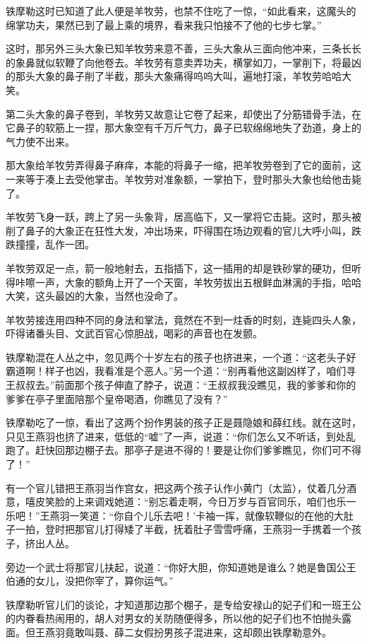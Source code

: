 \documentclass[12pt,oneside]{book}
\begin{document}
铁摩勒这时已知道了此人便是羊牧劳，也禁不住吃了一惊，``如此看来，这魔头的绵掌功夫，果然已到了最上乘的境界，看来我只怕接不了他的七步七掌。''

这时，那另外三头大象已知羊牧劳来意不善，三头大象从三面向他冲来，三条长长的象鼻就似软鞭了向他卷去。羊牧劳有意卖弄功夫，横掌如刀，一掌削下，将最凶的那头大象的鼻子削了半截，那头大象痛得呜呜大叫，遍地打滚，羊牧劳哈哈大笑。

第二头大象的鼻子卷到，羊牧劳又故意让它卷了起来，却使出了分筋错骨手法，在它鼻子的软筋上一捏，那大象空有千万斤气力，鼻子已软绵绵地失了劲道，身上的气力使不出来。

那大象给羊牧劳弄得鼻子麻痒，本能的将鼻子一缩，把羊牧劳卷到了它的面前，这一来等于凑上去受他掌击。羊牧劳对准象额，一掌拍下，登时那头大象也给他击毙了。

羊牧劳飞身一跃，跨上了另一头象背，居高临下，又一掌将它击毙。这时，那头被削了鼻子的大象正在狂性大发，冲出场来，吓得围在场边观看的官儿大呼小叫，跌跌撞撞，乱作一团。

羊牧劳双足一点，箭一般地射去，五指插下，这一插用的却是铁砂掌的硬功，但听得咔嚓一声，大象的额角上开了一个天窗，羊牧劳拔出五根鲜血淋漓的手指，哈哈大笑，这头最凶的大象，当然也没命了。

羊牧劳接连用四种不同的身法和掌法，竟然在不到一炷香的时刻，连毙四头人象，吓得诸番头目、文武百官心惊胆战，喝彩的声音也在发颤。

铁摩勒混在人丛之中，忽见两个十岁左右的孩子也挤进来，一个道：``这老头子好霸道啊！样子也凶，我看准是个恶人。''另一个道：``别再看他这副凶样了，咱们寻王叔叔去。''前面那个孩子伸直了脖子，说道：``王叔叔我没瞧见，我的爹爹和你的爹爹在亭子里面陪那个皇帝喝酒，你瞧见了没有？''

铁摩勒吃了一惊，看出了这两个扮作男装的孩子正是聂隐娘和薛红线。就在这时，只见王燕羽也挤了进来，低低的``嘘''了一声，说道：``你们怎么又不听话，到处乱跑了。赶快回那边棚子去。那亭子是进不得的！要是让你们爹爹瞧见，你们可不得了！''

有一个官儿错把王燕羽当作宫女，把这两个孩子认作小黄门（太监），仗着几分酒意，嘻皮笑脸的上来调戏她道：``别忘着走啊，今日万岁与百官同乐，咱们也乐一乐吧！''王燕羽一笑道：``你自个儿乐去吧！'卡袖一挥，就像软鞭似的在他的大肚子一拍，登时把那官儿打得矮了半截，抚着肚子雪雪呼痛，王燕羽一手携着一个孩子，挤出人丛。

旁边一个武士将那官儿扶起，说道：``你好大胆，你知道她是谁么？她是鲁国公王伯通的女儿，没把你宰了，算你运气。''

铁摩勒听官儿们的谈论，才知道那边那个棚子，是专给安禄山的妃子们和一班王公的内眷看热闹用的，胡人对男女的关防随便得多，所以他的妃子们也不怕抛头露面。但王燕羽竟敢叫聂、薛二女假扮男孩子混进来，这却颇出铁摩勒意外。
\end{document}
